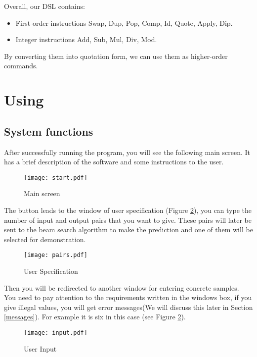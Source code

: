 \noindent Overall, our DSL contains:
\begin{itemize}
    \item First-order instructions Swap, Dup, Pop, Comp, Id, Quote, Apply, Dip.
    \item Integer instructions Add, Sub, Mul, Div, Mod.
\end{itemize}
By converting them into quotation form, we can use them as higher-order commands.


\section{Using}
\label{using}
\subsection{System functions}

After successfully running the program, you will see the following main screen. It has a brief description of the software and some instructions to the user.
\begin{figure}[H]
    \centering
    \texttt{[image: start.pdf]}
	\caption{Main screen}
	\label{fig:main screen}
\end{figure}

The button leads to the window of user specification (Figure \ref{fig:user specification}), you can type the number of input and output pairs that you want to give. These pairs will later be sent to the beam search algorithm to make the prediction and one of them will be selected for demonstration.

\begin{figure}[H]
    \centering
    \texttt{[image: pairs.pdf]}
	\caption{User Specification}
	\label{fig:user specification}
\end{figure}

Then you will be redirected to another window for entering concrete samples. You need to pay attention to the requirements written in the windows box, if you give illegal values, you will get error messages(We will discuss this later in Section \ref{messages}). For example it is six in this case (see Figure \ref{fig:user specification}).

\begin{figure}[H]
    \centering
    \texttt{[image: input.pdf]}
	\caption{User Input}
	\label{fig:user input}
\end{figure}

